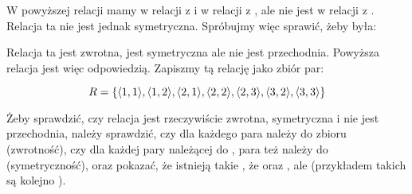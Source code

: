 \begin{example}
W powyższej relacji mamy  w relacji z  i  w relacji z , ale  nie jest w relacji z . Relacja ta nie jest jednak symetryczna. Spróbujmy więc sprawić, żeby była:

\begin{center}
\end{center}

Relacja ta jest zwrotna, jest symetryczna ale nie jest przechodnia. Powyższa relacja jest więc odpowiedzią. Zapiszmy tą relację jako zbiór par:

\[
    R = \{ \langle 1,1 \rangle, \langle 1,2 \rangle, \langle 2,1 \rangle, \langle 2,2 \rangle, \langle 2,3 \rangle, \langle 3,2 \rangle, \langle 3,3 \rangle \} 
\]

Żeby sprawdzić, czy relacja jest rzeczywiście zwrotna, symetryczna i nie jest przechodnia, należy sprawdzić, czy dla każdego  para  należy do zbioru  (zwrotność), czy dla każdej pary  należącej do , para  też należy do  (symetryczność), oraz pokazać, że istnieją takie , że  oraz , ale  (przykładem takich  są kolejno ).

\end{example}
